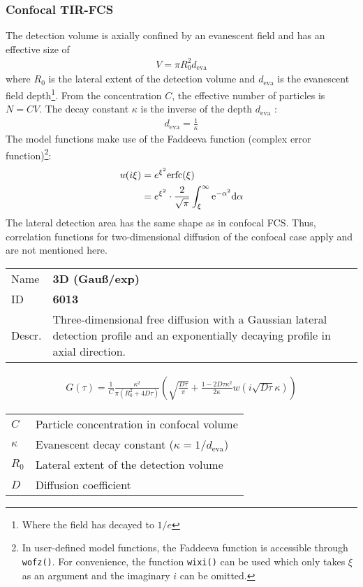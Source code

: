 \subsubsection{Confocal TIR-FCS}
The detection volume is axially confined by an evanescent field and has an effective size of
\begin{align}
V = \pi R_0^2 d_\mathrm{eva}
\end{align} 
where $R_0$ is the lateral extent of the detection volume and $d_\mathrm{eva}$ is the evanescent field depth\footnote{Where the field has decayed to $1/e$}. From the concentration $C$, the effective number of particles is $N=CV$.
The decay constant $\kappa$ is the inverse of the depth $d_\mathrm{eva}$ :
\begin{align}
d_\mathrm{eva} = \frac{1}{\kappa}
\end{align} 
The model functions make use of the Faddeeva function (complex error function)\footnote{In user-defined model functions, the Faddeeva function is accessible through \texttt{wofz()}. For convenience, the function \texttt{wixi()} can be used which only takes $\xi$ as an argument and the imaginary $i$ can be omitted.}:
\begin{align}
w\!(i\xi) &= e^{\xi^2} \mathrm{erfc}(\xi) \\
\notag &= e^{\xi^2} \cdot  \frac{2}{\sqrt{\pi}} \int_\xi^\infty \mathrm{e}^{-\alpha^2} \mathrm{d\alpha} \label{eq:faddeeva}
\end{align} 
The lateral detection area has the same shape as in confocal FCS. Thus, correlation functions for two-dimensional diffusion of the confocal case apply and are not mentioned here. \\
\vspace{2em}


\noindent \begin{tabular}{lp{}}
Name & \textbf{3D (Gauß/exp)} \\ 
ID & \textbf{6013} \\ 
Descr. &  Three-dimensional free diffusion with a Gaussian lateral detection profile and an exponentially decaying profile in axial direction. \\ 
\end{tabular}
\begin{align}
G(\tau) = \frac{1}{C}  \frac{ \kappa^2}{ \pi (R_0^2 +4D\tau)}
 \left( \sqrt{\frac{D \tau}{\pi}} + \frac{1 - 2 D \tau \kappa^2}{2 \kappa}  w\!\left(i \sqrt{D \tau} \kappa\right) \right)
\end{align} 
\begin{center}
\begin{tabular}{ll}
$C$ & Particle concentration in confocal volume \\ 
$\kappa$ &  Evanescent decay constant ($\kappa = 1/d_\mathrm{eva}$)\\ 
$R_0$ & Lateral extent of the detection volume \\
$D$ & Diffusion coefficient  \\
\end{tabular}
\end{center}
\vspace{2em}


